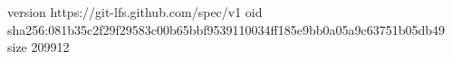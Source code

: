 version https://git-lfs.github.com/spec/v1
oid sha256:081b35c2f29f29583c00b65bbf9539110034ff185e9bb0a05a9c63751b05db49
size 209912

